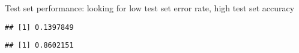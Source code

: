 \documentclass[]{article}
\newenvironment{Shaded}{\begin{snugshade}}{\end{snugshade}}
\newcommand{\KeywordTok}[1]{\textcolor[rgb]{0.13,0.29,0.53}{\textbf{#1}}}
\newcommand{\NormalTok}[1]{#1}
\newcommand{\OperatorTok}[1]{\textcolor[rgb]{0.81,0.36,0.00}{\textbf{#1}}}
\newcommand{\StringTok}[1]{\textcolor[rgb]{0.31,0.60,0.02}{#1}}
\begin{document}
Test set performance: looking for low test set error rate, high test set
accuracy

\begin{Shaded}
\end{Shaded}

\begin{verbatim}
## [1] 0.1397849
\end{verbatim}

\begin{Shaded}
\end{Shaded}

\begin{verbatim}
## [1] 0.8602151
\end{verbatim}
\end{document}

